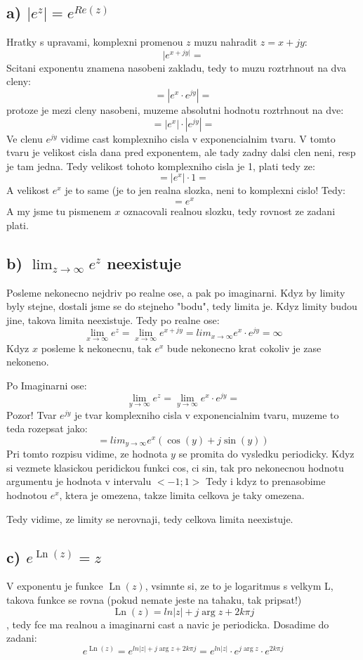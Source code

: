\subsection{a) $|e^z| = e^{Re(z)}$}
Hratky s upravami, komplexni promenou $z$ muzu nahradit $z = x+jy$:
$$|e^{x+jy|}=$$
Scitani exponentu znamena nasobeni zakladu, tedy to muzu roztrhnout na dva cleny:
$$=|e^x \cdot e^{jy}|=$$
protoze je mezi cleny nasobeni, muzeme absolutni hodnotu roztrhnout na dve:
$$=|e^x|\cdot |e^{jy}| = $$
Ve clenu $e^{jy}$ vidime cast komplexniho cisla v exponencialnim tvaru. V tomto tvaru je velikost cisla dana pred exponentem, ale tady zadny dalsi clen neni, resp je tam jedna. Tedy velikost tohoto komplexniho cisla je 1, plati tedy ze:
$$=|e^x| \cdot 1 =$$
A velikost $e^x$ je to same (je to jen realna slozka, neni to komplexni cislo! Tedy:
$$= e^x$$
A my jsme tu pismenem $x$ oznacovali realnou slozku, tedy rovnost ze zadani plati.


\subsection{b) $\lim_{z \to \infty} e^z$ neexistuje}
Posleme nekonecno nejdriv po realne ose, a pak po imaginarni. Kdyz by limity byly stejne, dostali jsme se do stejneho "bodu", tedy limita je. Kdyz limity budou jine, takova limita neexistuje. Tedy po realne ose:
$$\lim_{x \to \infty} e^z = \lim_{x \to \infty} e^{x+jy} = lim_{x \to\infty} e^x \cdot e^{jy} = \infty$$
Kdyz $x$ posleme k nekonecnu, tak $e^x$ bude nekonecno krat cokoliv je zase nekoneno.

Po Imaginarni ose:
$$\lim_{y \to \infty} e^z = \lim_{y \to \infty} e^x \cdot e^{jy} =$$
Pozor! Tvar $e^{jy}$ je tvar komplexniho cisla v exponencialnim tvaru, muzeme to teda rozepsat jako:
$$= lim_{y \to \infty} e^x (\operatorname{cos}(y)+j\operatorname{sin}(y))$$
Pri tomto rozpisu vidime, ze hodnota $y$ se promita do vysledku periodicky. Kdyz si vezmete klasickou peridickou funkci cos, ci sin, tak pro nekonecnou hodnotu argumentu je hodnota v intervalu $<-1;1>$ Tedy i kdyz to prenasobime hodnotou $e^x$, ktera je omezena, takze limita celkova je taky omezena. 

Tedy vidime, ze limity se nerovnaji, tedy celkova limita neexistuje.

\subsection{c) $e^{\operatorname{Ln}(z)} = z$}
V exponentu je funkce $\operatorname{Ln}(z)$, vsimnte si, ze to je logaritmus s velkym L, takova funkce se rovna (pokud nemate jeste na tahaku, tak pripsat!)
$$\operatorname{Ln}(z) = ln|z|+j\operatorname{arg}z+2k\pi j$$, tedy fce ma realnou a imaginarni cast a navic je periodicka. Dosadime do zadani:
$$e^{\operatorname{Ln}(z)} = e^{ln|z|+j\operatorname{arg}z+2k\pi j} = e^{ln|z|}\cdot e^{j\operatorname{arg}z}\cdot e^{2k \pi j}$$

